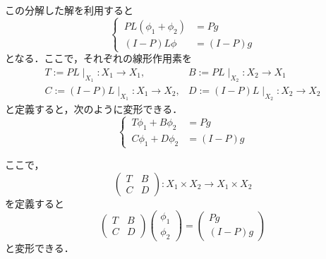  この分解した解を利用すると
  \begin{equation*}
    \left\{ \,
    \begin{aligned}
      PL(\phi_1+\phi_2) &= Pg \\
      (I-P)L\phi &= (I-P)g
    \end{aligned}
    \right.
  \end{equation*}
  となる．ここで，それぞれの線形作用素を
  \begin{equation*}
    \begin{array}{ll}
      T:=PL \mid_{X_1} : X_1 \rightarrow X_1, & B:=PL \mid_{X_2} : X_2 \rightarrow X_1 \\
      C:=(I-P)L \mid_{X_1} : X_1 \rightarrow X_2, & D:=(I-P)L \mid_{X_2} : X_2 \rightarrow X_2
   \end{array}
  \end{equation*}
  と定義すると，次のように変形できる．
  \begin{equation*}
    \left\{ \,
    \begin{aligned}
      T\phi_1+B\phi_2 &= Pg \\
      C\phi_1+D\phi_2 &= (I-P)g
    \end{aligned}
    \right.
  \end{equation*}

  ここで，
  \begin{equation*}
    \left(
    \begin{array}{cc}
      T & B \\
      C & D
    \end{array}
    \right)
    :X_1 \times X_2 \rightarrow  X_1 \times X_2
  \end{equation*}
  を定義すると
  \begin{equation*}
    \left(
    \begin{array}{cc}
      T & B \\
      C & D
    \end{array}
    \right)
    \begin{pmatrix}
      \phi_1 \\
      \phi_2
    \end{pmatrix}
    =
    \begin{pmatrix}
      Pg \\
      (I-P)g
    \end{pmatrix}
  \end{equation*}
  と変形できる．

